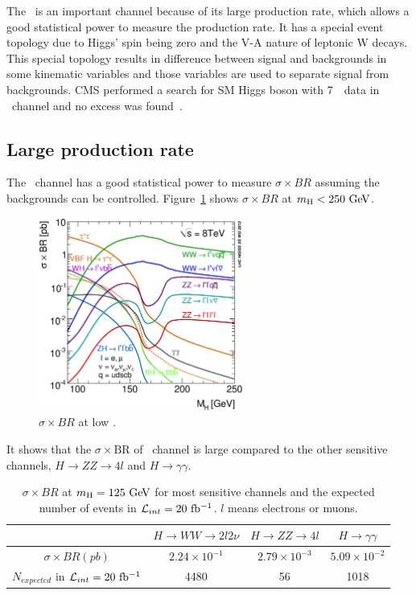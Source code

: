 The \hww\ is an important channel because of its large production rate, 
which allows a good statistical power to measure the production rate. 
It has a special event topology due to Higgs' spin being zero and 
the V-A nature of leptonic W decays. This special topology results 
in difference between signal and backgrounds in some kinematic variables
and those variables are used to separate signal from backgrounds. 
CMS performed a search for SM Higgs boson with 7~\TeV\ data
in \hww\ channel and no excess was found~\cite{Chatrchyan:2012ty}. 

%
\subsection{Large production rate}

The \hww\ channel has a good statistical power to measure $\sigma \times BR$
assuming the backgrounds can be controlled.
Figure~\ref{fig:XSBR_8TeV_SM_LM} shows $\sigma \times BR$ at $m_{\mathrm{H}}<250~\mathrm{Ge\kern -0.1em V}$.
\begin{figure}[t]
\centering
\includegraphics[width=0.6\textwidth]{figures/XSBR_8TeV_SM_LM.eps}
\caption{$\sigma \times BR$ at low \mHi.}
\label{fig:XSBR_8TeV_SM_LM}
\end{figure}
It shows that the $\sigma \times \textrm{BR}$ of \hww\ channel 
is large compared to the other sensitive channels, $H \rightarrow ZZ\rightarrow 4l$
and $H \rightarrow\gamma\gamma$. 
\begin{table}[htb]
\centering
\label{tab:XSBR_8TeV_SM_125}
\vspace{0.5cm} 
\caption{$\sigma \times BR$ at $m_{\mathrm{H}}=125~\mathrm{Ge\kern -0.1em V}$ for most sensitive channels 
and the expected number of events in $\mathcal{L}_{int} = 20~\mathrm{fb^{-1}}$.
$l$ means electrons or muons.}
\vspace{0.5cm} 
\begin{tabular}{c | c c c}
\hline 
        & $H \rightarrow WW \rightarrow 2l2\nu$   & $H \rightarrow ZZ\rightarrow 4l$ 
        & $H \rightarrow\gamma\gamma$  \\
\hline \hline 
$\sigma \times BR (pb)$  
        & $2.24\times10^{-1}$ &  $2.79\times10^{-3}$ & $5.09\times10^{-2}$ \\ 
$N_{expected}$ in $\mathcal{L}_{int} = 20~\mathrm{fb^{-1}}$ 
        & 4480 &  56 & 1018 \\ 
\hline 
\end{tabular}
\end{table}
